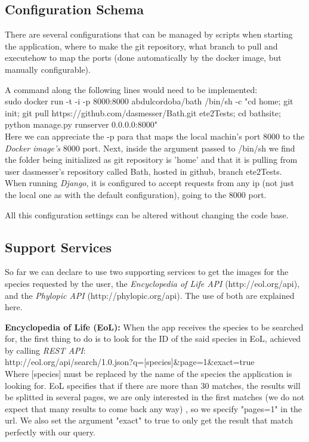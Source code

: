 \documentclass[10pt]{article}
\begin{document}
 \subsection{Configuration Schema}
 
There are several configurations that can be managed by scripts when starting the application, where to make the git repository, what branch to pull and executehow to map the ports (done automatically by the docker image, but manually configurable).

A command along the following lines would need to be implemented:\\

sudo docker run -t -i -p 8000:8000 abdulcordoba/bath /bin/sh -c "cd home; git init; git pull https://github.com/dasmesser/Bath.git ete2Tests; cd bathsite; python manage.py runserver 0.0.0.0:8000"\\

Here we can appreciate the -p para that maps the local machin's port 8000 to the \textit{Docker image's} 8000 port. Next, inside the argument passed to /bin/sh we find the folder being initialized as git repository is 'home' and that it is pulling from user dasmesser's repository called Bath, hosted in github, branch ete2Tests. When running \textit{Django}, it is configured to accept requests from any ip (not just the local one as with the default configuration), going to the 8000 port.

All this configuration settings can be altered without changing the code base.
 
 \subsection{Support Services}
 
So far we can declare to use two supporting services to get the images for the species requested by the user, the \textit{Encyclopedia of Life API} (http://eol.org/api), and the \textit{Phylopic API} (http://phylopic.org/api). The use of both are explained here.

\textbf{Encyclopedia of Life (EoL):} When the app receives the species to be searched for, the first thing to do is to look for the ID of the said species in EoL, achieved by calling \textit{REST API}:\\

http://eol.org/api/search/1.0.json?q=[species]\&page=1\&exact=true\\

Where [species] must be replaced by the name of the species the application is looking for. EoL specifies that if there are more than 30 matches, the results will be splitted in several pages, we are only interested in the first matches (we do not expect that many results to come back any way) , so we specify "pages=1" in the url. We also set the argument "exact" to true to only get the result that match perfectly with our query.
\end{document}
